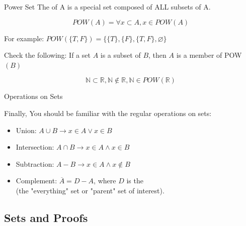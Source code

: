 \begin{frame}[t]{Power Set}
  The  of A is a special set composed of ALL subsets of A.

  \begin{equation*}
    POW(A) = \forall x \subset A, x \in POW(A)
  \end{equation*}

  For example: $POW(\{T,F\}) = \{\{T\},\{F\},\{T,F\},\varnothing\}$\vfill
    
  \alert{Check the following}: If a set $A$ is a subset of $B$, then $A$ is a member of POW$(B)$

  \begin{equation*}
    \mathbb{N} \subset \mathbb{R}, \mathbb{N} \notin \mathbb{R}, \mathbb{N} \in POW(\mathbb{R})
  \end{equation*}
\end{frame}


\begin{frame}{Operations on Sets}

  Finally, You should be familiar with the regular operations on sets:
  \bigskip

    \begin{itemize}
    \item Union: $A \cup B \rightarrow x \in A \lor x \in B$\bigskip
    \item Intersection: $A \cap B \rightarrow x \in A \land x \in B$\bigskip
    \item Subtraction: $A - B \rightarrow x \in A \land x \notin B$\bigskip
    \item Complement: $\overline{A} = D - A$, where $D$ is the \\ (the "everything" set or "parent" set of interest).
    \end{itemize}
\end{frame}

\subsection{Sets and Proofs}

